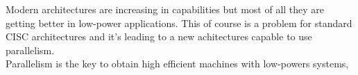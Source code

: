 Modern architectures are increasing in capabilities but most of all they are getting better in low-power applications.
This of course is a problem for standard CISC architectures and it's leading to a new achitectures capable to use parallelism.\\

Parallelism is the key to obtain high efficient machines with low-powers systems, 





\bigskip
